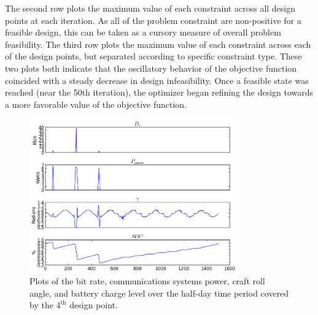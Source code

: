 \documentclass[]{aiaa-tc} %
\begin{document}
        The second row plots the maximum value of each constraint across all design points at
        each iteration. As all of the problem constraint are non-positive for a feasible design,
        this can be taken as a cursory measure of overall problem feasibility.
        The third row plots the maximum value of each constraint across each of the design points,
        but separated according to specific constraint type. These two plots both indicate that the
        oscillatory behavior of the objective function coincided with a steady decrease in design
        infeasibility. Once a feasible state was reached (near the 50th iteration), the optimizer
        began refining the design towards a more favorable value of the objective function.

        \begin{figure}
        \centering
        \includegraphics[width=0.8\textwidth]{images/pt_3_data}
        \caption[width=0.4\textwidth]{Plots of the bit rate, communications systems power, craft roll angle,
        and battery charge level over the half-day time period covered by the $4^{\textrm{th}}$ design point.
        \label{pt3_data_results}
        }
        \end{figure}
\end{document}
